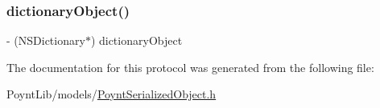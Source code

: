 \subsubsection{\texorpdfstring{dictionary\+Object()}{dictionaryObject()}}
{\footnotesize\ttfamily -\/ (N\+S\+Dictionary$\ast$) dictionary\+Object \begin{DoxyParamCaption}{ }\end{DoxyParamCaption}}



The documentation for this protocol was generated from the following file\+:\begin{DoxyCompactItemize}
\item 
Poynt\+Lib/models/\hyperlink{_poynt_serialized_object_8h}{Poynt\+Serialized\+Object.\+h}\end{DoxyCompactItemize}
